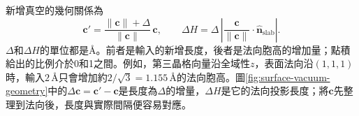 新增真空的幾何關係為
\begin{equation}
  \mathbf c'=
  \frac{\|\mathbf c\|+\Delta}{\|\mathbf c\|}\,\mathbf c,
  \qquad
  \Delta H=\Delta\,
  \left|\frac{\mathbf c}{\|\mathbf c\|}\cdot\hat{\mathbf n}_{\mathrm{slab}}\right|.
  \label{eq:vacuum-addition-projection}
\end{equation}
$\Delta$和$\Delta H$的單位都是\AA。前者是輸入的新增長度，後者是法向胞高的增加量；點積給出的比例介於0和1之間。例如，第三晶格向量沿全域性$z$，表面法向沿$(1,1,1)$時，輸入$2\,\text{\AA}$只會增加約$2/\sqrt{3}=1.155\,\text{\AA}$的法向胞高。圖\ref{fig:surface-vacuum-geometry}中的$\Delta\mathbf c=\mathbf c'-\mathbf c$是長度為$\Delta$的增量，$\Delta H$是它的法向投影長度；將$\mathbf c$先整理到法向後，長度與實際間隔便容易對應。

